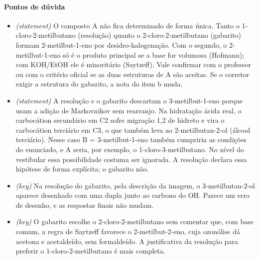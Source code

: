 \documentclass{article}%
\begin{document}
\paragraph{Pontos de dúvida}%
\begin{itemize}%
\item%
\textit{(statement)} O composto A não fica determinado de forma única. Tanto o 1{-}cloro{-}2{-}metilbutano (resolução) quanto o 2{-}cloro{-}2{-}metilbutano (gabarito) formam 2{-}metilbut{-}1{-}eno por desidro{-}halogenação. Com o segundo, o 2{-}metilbut{-}1{-}eno só é o produto principal se a base for volumosa (Hofmann); com KOH/EtOH ele é minoritário (Saytzeff). Vale confirmar com o professor ou com o critério oficial se as duas estruturas de A são aceitas. Se o corretor exigir a estrutura do gabarito, a nota do item b muda.%
\item%
\textit{(statement)} A resolução e o gabarito descartam o 3{-}metilbut{-}1{-}eno porque usam a adição de Markovnikov sem rearranjo. Na hidratação ácida real, o carbocátion secundário em C2 sofre migração 1,2 de hidreto e vira o carbocátion terciário em C3, o que também leva ao 2{-}metilbutan{-}2{-}ol (álcool terciário). Nesse caso B = 3{-}metilbut{-}1{-}eno também cumpriria as condições do enunciado, e A seria, por exemplo, o 1{-}cloro{-}3{-}metilbutano. No nível do vestibular essa possibilidade costuma ser ignorada. A resolução declara essa hipótese de forma explícita; o gabarito não.%
\item%
\textit{(key)} Na resolução do gabarito, pela descrição da imagem, o 3{-}metilbutan{-}2{-}ol aparece desenhado com uma dupla junto ao carbono do OH. Parece um erro de desenho, e as respostas finais não mudam.%
\item%
\textit{(key)} O gabarito escolhe o 2{-}cloro{-}2{-}metilbutano sem comentar que, com base comum, a regra de Saytzeff favorece o 2{-}metilbut{-}2{-}eno, cuja ozonólise dá acetona e acetaldeído, sem formaldeído. A justificativa da resolução para preferir o 1{-}cloro{-}2{-}metilbutano é mais completa.%
\end{itemize}%
\end{document}
